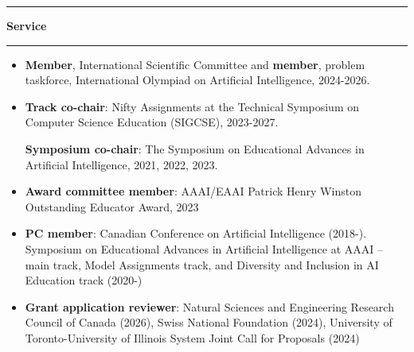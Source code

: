 \documentclass[letterpaper,11pt]{article}
\newcommand{\resheading}[1]{%
  \vspace{10pt}%
  \noindent\textcolor{accent}{\rule{3pt}{12pt}}\hspace{6pt}%
  {\large \textbf{\textcolor{accent}{#1}}}%
  \vspace{2pt}%
  \par\noindent\textcolor{accent!30}{\rule{\textwidth}{0.5pt}}%
  \vspace{2pt}%
}
\begin{document}
\resheading{Service}
\begin{itemize}
\item
    \textbf{Member}, International Scientific Committee and \textbf{member}, problem taskforce, International Olympiad on Artificial Intelligence, 2024-2026.
\item
    \textbf{Track co-chair}: Nifty Assignments at the Technical Symposium on Computer Science Education (SIGCSE), 2023-2027.
    
    \textbf{Symposium co-chair}: The Symposium on Educational Advances in Artificial Intelligence, 2021, 2022, 2023.
\item 
	\textbf{Award committee member}: AAAI/EAAI Patrick Henry Winston Outstanding Educator Award, 2023

\item
	\textbf{PC member}: Canadian Conference on Artificial Intelligence (2018-). Symposium on Educational Advances in Artificial Intelligence at AAAI -- main track, Model Assignments track, and  Diversity and Inclusion in AI Education track (2020-)

\item 
\textbf{Grant application reviewer}: Natural Sciences and Engineering Research Council of Canada
 (2026), Swiss National Foundation (2024), University of Toronto-University of Illinois System Joint Call for Proposals (2024)


\end{itemize}
\end{document}
